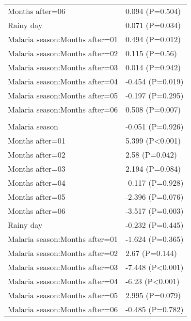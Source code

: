 \documentclass[]{article}
\begin{document}
\begin{longtable}[t]{ll}
\hspace{1em}Months after=06 & 0.094 (P=0.504)\\
\hspace{1em}Rainy day & 0.071 (P=0.034)\\
\hspace{1em}Malaria season:Months after=01 & 0.494 (P=0.012)\\
\hspace{1em}Malaria season:Months after=02 & 0.115 (P=0.56)\\
\hspace{1em}Malaria season:Months after=03 & 0.014 (P=0.942)\\
\hspace{1em}Malaria season:Months after=04 & -0.454 (P=0.019)\\
\hspace{1em}Malaria season:Months after=05 & -0.197 (P=0.295)\\
\hspace{1em}Malaria season:Months after=06 & 0.508 (P=0.007)\\
\addlinespace[1.5em]
\multicolumn{2}{l}{\textbf{Temporary not field worker}}\\
\hspace{1em}Malaria season & -0.051 (P=0.926)\\
\hspace{1em}Months after=01 & 5.399 (P<0.001)\\
\hspace{1em}Months after=02 & 2.58 (P=0.042)\\
\hspace{1em}Months after=03 & 2.194 (P=0.084)\\
\hspace{1em}Months after=04 & -0.117 (P=0.928)\\
\hspace{1em}Months after=05 & -2.396 (P=0.076)\\
\hspace{1em}Months after=06 & -3.517 (P=0.003)\\
\hspace{1em}Rainy day & -0.232 (P=0.445)\\
\hspace{1em}Malaria season:Months after=01 & -1.624 (P=0.365)\\
\hspace{1em}Malaria season:Months after=02 & 2.67 (P=0.144)\\
\hspace{1em}Malaria season:Months after=03 & -7.448 (P<0.001)\\
\hspace{1em}Malaria season:Months after=04 & -6.23 (P<0.001)\\
\hspace{1em}Malaria season:Months after=05 & 2.995 (P=0.079)\\
\hspace{1em}Malaria season:Months after=06 & -0.485 (P=0.782)\\*
\end{longtable}
\end{document}
